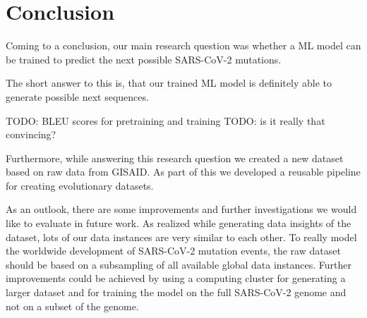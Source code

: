 \section{Conclusion} \label{conclusion}

Coming to a conclusion, our main research question was whether a \ac{ML} model can be trained to predict the next possible \ac{SARS-CoV-2} mutations.

The short answer to this is, that our trained \ac{ML} model is definitely able to generate possible next sequences. 

TODO: BLEU scores for pretraining and training
TODO: is it really that convincing?

Furthermore, while answering this research question we created a new dataset based on raw data from \ac{GISAID}. As part of this we developed a reusable pipeline for creating evolutionary datasets.

\vspace{0.5cm}

As an outlook, there are some improvements and further investigations we would like to evaluate in future work. As realized while generating data insights of the dataset, lots of our data instances are very similar to each other. To really model the worldwide development of \ac{SARS-CoV-2} mutation events, the raw dataset should be based on a subsampling of all available global data instances. Further improvements could be achieved by using a computing cluster for generating a larger dataset and for training the model on the full \ac{SARS-CoV-2} genome and not on a subset of the genome.
